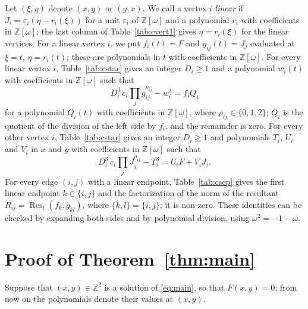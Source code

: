 \documentclass[11pt]{article}
\newcommand{\Z}{\mathbb{Z}}
\begin{document}
Let $(\xi,\eta)$ denote $(x,y)$ or $(y,x)$. We call a vertex $i$ \emph{linear} if $J_i=\varepsilon_i(\eta-r_i(\xi))$ for a unit $\varepsilon_i$ of $\Z[\omega]$ and a polynomial $r_i$ with coefficients in $\Z[\omega]$; the last column of Table~\ref{tab:cvert1} gives $\eta=r_i(\xi)$ for the linear vertices. For a linear vertex $i$, we put $f_i(t)=F$ and $g_{ij}(t)=J_j$ evaluated at $\xi=t$, $\eta=r_i(t)$; these are polynomials in $t$ with coefficients in $\Z[\omega]$.
For every linear vertex $i$, Table~\ref{tab:cstar} gives an integer $D_i\geq1$ and a polynomial $w_i(t)$ with coefficients in $\Z[\omega]$ such that
\begin{equation}\label{eq:cstarlin}
D_i^3\,c_i\prod_jg_{ij}^{\rho_{ij}}-w_i^3=f_iQ_i
\end{equation}
for a polynomial $Q_i(t)$ with coefficients in $\Z[\omega]$, where $\rho_{ij}\in\{0,1,2\}$; $Q_i$ is the quotient of the division of the left side by $f_i$, and the remainder is zero.
For every other vertex $i$, Table~\ref{tab:cstar} gives an integer $D_i\geq1$ and polynomials $T_i$, $U_i$ and $V_i$ in $x$ and $y$ with coefficients in $\Z[\omega]$ such that
\begin{equation}\label{eq:cstar}
D_i^3\,c_i\prod_jJ_j^{\rho_{ij}}-T_i^3=U_iF+V_iJ_i.
\end{equation}
For every edge $(i,j)$ with a linear endpoint, Table~\ref{tab:csep} gives the first linear endpoint $k\in\{i,j\}$ and the factorization of the norm of the resultant $R_{ij}=\operatorname{Res}_t(f_k,g_{kl})$, where $\{k,l\}=\{i,j\}$; it is non-zero.
These identities can be checked by expanding both sides and by polynomial division, using $\omega^2=-1-\omega$.

\section{Proof of Theorem~\ref{thm:main}}

Suppose that $(x,y)\in\Z^2$ is a solution of \eqref{eq:main}, so that $F(x,y)=0$; from now on the polynomials denote their values at $(x,y)$.
\end{document}

